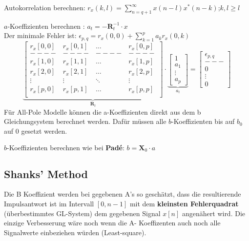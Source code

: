 \begin{aufzaehlung}
	\item Autokorrelation berechnen: $ r_x(k,l) = \sum\limits_{n=q+1}^\infty x(n-l)x^*(n-k)$;\qquad $k,l\geq l$
	\item $a$-Koeffizienten berechnen : $a_t = - \bm R_t^{-1} \cdot x$ 
  		 \small\\
		Der minimale Fehler ist: $\epsilon_{p,q} = r_x(0,0) + \sum\limits_{k=1}^p a_k r_x(0,k)$
			$$
		{\underbrace{\begin{bmatrix}
    		r_x[0,0] & r_x[0,1] & \hdots & r_x[0,p] \\ 
    		----&----&----&----\\
    		r_x[1,0] & r_x[1,1] & \hdots & r_x[1,p] \\                                   
    		r_x[2,0] & r_x[2,1] & \hdots & r_x[2,p] \\
    		\vdots & \vdots & \ddots & \vdots \\                             
    		r_x[p,0] & r_x[p,1] & \hdots & r_x[p,p] \\                        
		\end{bmatrix}  }_{\bm R_t}} \cdot \underbrace{\begin{bmatrix}
    		1 \\
    		a_1 \\
    		\vdots \\
    		a_p
		\end{bmatrix}  }_{a_t}= \begin{bmatrix}
    		\epsilon_{p,q} \\
    		---\\
    		0 \\
    		\vdots \\
    		0
		\end{bmatrix} $$ 
		Für All-Pole Modelle können die a-Koeffizienten direkt aus dem b Gleichungsystem berechnet werden. 
		Dafür müssen alle $b$-Koeffizienten bis auf $b_0$ auf 0 gesetzt werden.
	\item $b$-Koeffizienten berechnen wie bei \textbf{Padé}: $b = \bm X_0 \cdot a$ 
		\normalsize
\end{aufzaehlung}
	
\subsection{Shanks' Method }

Die B Koeffizient werden bei gegebenen A's so geschätzt, dass die resultierende Impulsantwort ist im Intervall $[0, n - 1]$ mit dem
\textbf{kleinsten Fehlerquadrat} (überbestimmtes GL-System) dem gegebenen
Signal $x[n]$ angenähert wird. Die einzige Verbesserung wäre noch wenn die A- Koeffizenten auch noch alle Signalwerte einbeziehen würden (Least-square).

